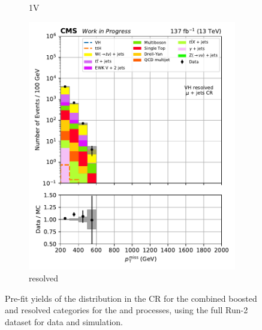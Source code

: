 \begin{figure}[htbp]
\begin{subfigure}[b]{0.24\textwidth}
        \caption{\VH 1V}
    \end{subfigure}
    \hfill
    \begin{subfigure}[b]{0.24\textwidth}
        \includegraphics[width=\textwidth]{figures/region_plots/2016to18/region_1/VH_resolved.pdf}
        \caption{\VH resolved}
    \end{subfigure}
    \caption[Pre-fit yields of the \ptmiss distribution in the \singleMuCr control region for the combined boosted and resolved categories for the \ttH and \VH processes, using the full Run-2 dataset for data and simulation]{Pre-fit yields of the \ptmiss distribution in the \singleMuCr \gls{CR} for the combined boosted and resolved categories for the \ttH and \VH processes, using the full Run-2 dataset for data and simulation.}
    \label{fig:htoinv_cr_yields_comb2016to18_single_muon}
\end{figure}

